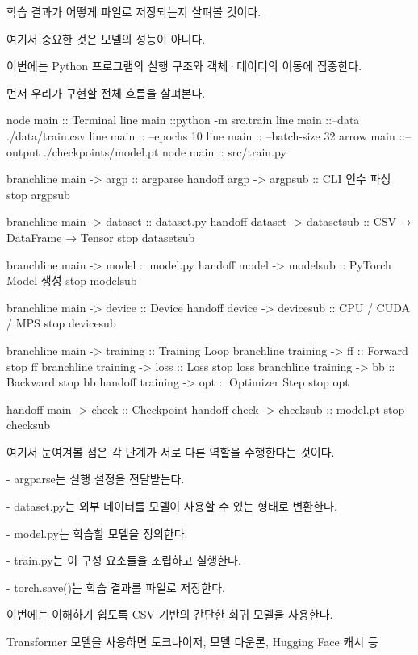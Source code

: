 학습 결과가 어떻게 파일로 저장되는지 살펴볼 것이다.

여기서 중요한 것은 모델의 성능이 아니다.

이번에는 Python 프로그램의 실행 구조와 객체·데이터의 이동에 집중한다.

먼저 우리가 구현할 전체 흐름을 살펴본다.

\begin{dhkbranch}[in=8]
node main :: Terminal
line main ::python -m src.train
line main ::--data ./data/train.csv
line main :: --epochs 10
line main :: --batch-size 32
arrow main ::--output ./checkpoints/model.pt
node main :: src/train.py

branchline main -> argp :: argparse
handoff argp -> argpsub :: CLI 인수 파싱
stop argpsub

branchline main -> dataset :: dataset.py
handoff dataset -> datasetsub :: CSV → DataFrame → Tensor
stop datasetsub

branchline main -> model :: model.py
handoff model -> modelsub :: PyTorch Model 생성
stop modelsub

branchline main -> device :: Device
handoff device -> devicesub :: CPU / CUDA / MPS
stop devicesub

branchline main -> training :: Training Loop
branchline training -> ff :: Forward
stop ff
branchline training -> loss :: Loss
stop loss
branchline training -> bb :: Backward
stop bb
handoff training -> opt :: Optimizer Step
stop opt

handoff main -> check :: Checkpoint
handoff check -> checksub :: model.pt
stop checksub
\end{dhkbranch}

여기서 눈여겨볼 점은 각 단계가 서로 다른 역할을 수행한다는 것이다.

\begin{dhksmry}
    - argparse는 실행 설정을 전달받는다.

    - dataset.py는 외부 데이터를 모델이 사용할 수 있는 형태로 변환한다.

    - model.py는 학습할 모델을 정의한다.

    - train.py는 이 구성 요소들을 조립하고 실행한다.

    - torch.save()는 학습 결과를 파일로 저장한다.
\end{dhksmry}

이번에는 이해하기 쉽도록 CSV 기반의 간단한 회귀 모델을 사용한다.

Transformer 모델을 사용하면 토크나이저, 모델 다운롣, Hugging Face 캐시 등

